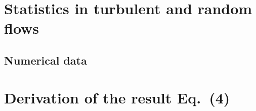 \documentclass[thesis.tex]{subfiles}
\begin{document}
\section{Statistics in turbulent and random flows}






\subsection{Numerical data}


\section{Derivation of the result Eq.~(4)}
\end{document}
